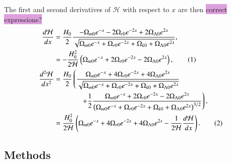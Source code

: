 \documentclass{aa}
\newcommand\numberthis{\addtocounter{equation}{1}\tag{\theequation}}
\begin{document}
The first and second derivatives of $\mathcal{H}$ with respect to $x$ are then \colorbox{Plum}{correct expressions?}
\begin{align*}
  \frac{d\mathcal{H}}{dx} &= \frac{H_0}{2}
  \frac{-\Omega_{m0}e^{-x} - 2\Omega_{r0}e^{-2x} + 2\Omega_{\Lambda0}e^{2x}}
  {\sqrt{\Omega_{m0}e^{-x} 
  + \Omega_{r0}e^{-2x}
  + \Omega_{k0} + \Omega_{\Lambda0}e^{2x}}},
  \\
  &= -\frac{H_0^2}{2\mathcal{H}}\left(\Omega_{m0}e^{-x} + 2\Omega_{r0}e^{-2x} - 2\Omega_{\Lambda0}e^{2x}\right), \numberthis
  \\
  \frac{d^2\mathcal{H}}{dx^2} &= \frac{H_0}{2}
  \left(\frac{\Omega_{m0}e^{-x} + 4\Omega_{r0}e^{-2x} + 4\Omega_{\Lambda0}e^{2x}}{\sqrt{\Omega_{m0}e^{-x} + \Omega_{r0}e^{-2x} + \Omega_{k0} + \Omega_{\Lambda0}e^{2x}}}\right.
  \\
  &\hspace{38pt}
  \left.+ \frac{1}{2}\frac{\Omega_{m0}e^{-x} + 2\Omega_{r0}e^{-2x} - 2\Omega_{\Lambda0}e^{2x}}{\left(\Omega_{m0}e^{-x} + \Omega_{r0}e^{-2x} + \Omega_{k0} + \Omega_{\Lambda0}e^{2x}\right)^{3/2}}\right),
  \\
  &= \frac{H_0^2}{2\mathcal{H}}\left(\Omega_{m0}e^{-x} + 4\Omega_{r0}e^{-2x} + 4\Omega_{\Lambda0}e^{2x}- \frac{1}{2\mathcal{H}}\frac{d\mathcal{H}}{dx}\right). \numberthis
\end{align*}


\subsection{Methods}\label{subsec: I methods}
\end{document}
